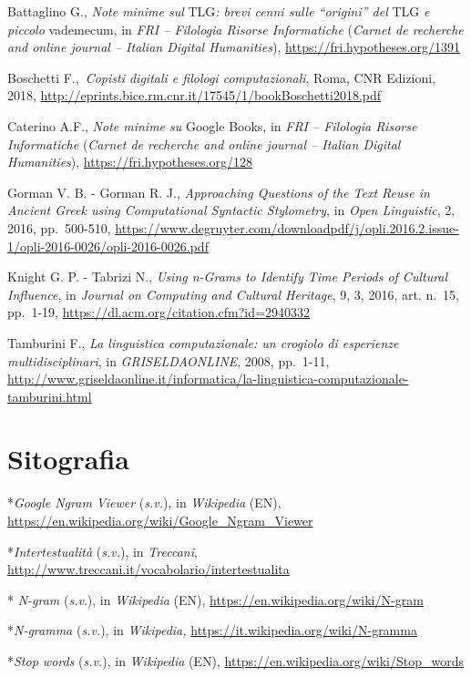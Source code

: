 \documentclass[
  b5paper,
  twoside,
  12pt,
  chapterprefix=false,
  bibliography=totocnumbered,
  parskip=false]{scrbook}
\begin{document}
Battaglino G., \emph{Note minime sul} TLG\emph{: brevi cenni sulle \enquote{origini} del}
TLG \emph{e piccolo} vademecum, in \emph{FRI -- Filologia Risorse Informatiche}
(\emph{Carnet de recherche and online journal -- Italian Digital
Humanities}),
\url{https://fri.hypotheses.org/1391}

Boschetti F.,~\emph{Copisti digitali e filologi computazionali}, Roma, CNR
Edizioni, 2018,
\url{http://eprints.bice.rm.cnr.it/17545/1/bookBoschetti2018.pdf}

Caterino A.F., \emph{Note minime su} Google Books, in \emph{FRI -- Filologia
Risorse Informatiche} (\emph{Carnet de recherche and online journal --
Italian Digital Humanities}),
\url{https://fri.hypotheses.org/128}

Gorman V. B. - Gorman R. J., \emph{Approaching Questions of the Text Reuse in
Ancient Greek using Computational Syntactic Stylometry}, in \emph{Open
Linguistic}, 2, 2016, pp.~500-510,
\url{https://www.degruyter.com/downloadpdf/j/opli.2016.2.issue-1/opli-2016-0026/opli-2016-0026.pdf}

Knight G. P. - Tabrizi N., \emph{Using n-Grams to Identify Time Periods of
Cultural Influence}, in \emph{Journal on Computing and Cultural Heritage}, 9,
3, 2016, art. n.~15, pp.~1-19,
\url{https://dl.acm.org/citation.cfm?id=2940332}

Tamburini F., \emph{La linguistica computazionale: un crogiolo di esperienze
multidisciplinari}, in \emph{GRISELDAONLINE}, 2008, pp.~1-11,
\url{http://www.griseldaonline.it/informatica/la-linguistica-computazionale-tamburini.html}

\hypertarget{sitografia-22}{%
\section*{Sitografia}\label{sitografia-22}}

*\emph{Google Ngram Viewer} (\emph{s.v.}), in \emph{Wikipedia} (EN),
\url{https://en.wikipedia.org/wiki/Google_Ngram_Viewer}

*\emph{Intertestualità} (\emph{s.v.}), in \emph{Treccani},
\url{http://www.treccani.it/vocabolario/intertestualita}

* \emph{N-gram} (\emph{s.v}.), in \emph{Wikipedia} (EN),
\url{https://en.wikipedia.org/wiki/N-gram}

*\emph{N-gramma} (\emph{s.v.}), in \emph{Wikipedia,}
\url{https://it.wikipedia.org/wiki/N-gramma}

*\emph{Stop words} (\emph{s.v.}), in \emph{Wikipedia} (EN),
\url{https://en.wikipedia.org/wiki/Stop_words}
\end{document}
